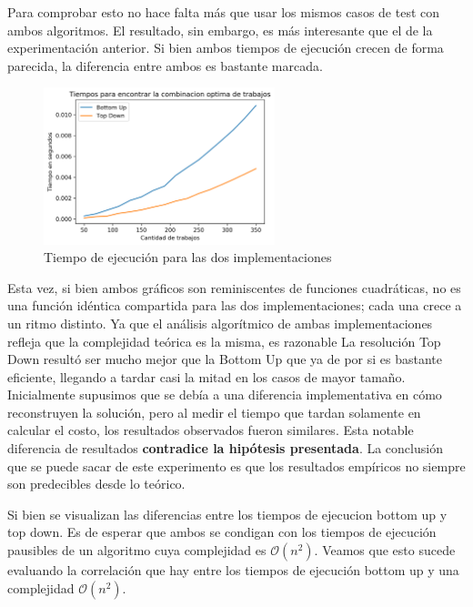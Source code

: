 \documentclass[a4paper]{report}
\begin{document}
Para comprobar esto no hace falta más que usar los mismos casos de test con ambos algoritmos. El resultado, sin embargo, es más interesante que el de la experimentación anterior. Si bien ambos tiempos de ejecución crecen de forma parecida, la diferencia entre ambos es bastante marcada. 

\begin{figure}
    \includegraphics[width=0.6\textwidth]{bottomUp_topDown.png}
    \caption{Tiempo de ejecución para las dos implementaciones}
    \label{fig:bottomup_topdown}
\end{figure}

Esta vez, si bien ambos gráficos son reminiscentes de funciones cuadráticas, no es una función idéntica compartida para las dos implementaciones; cada una crece a un ritmo distinto. Ya que el análisis algorítmico de ambas implementaciones refleja que la complejidad teórica es la misma, es razonable  La resolución Top Down resultó ser mucho mejor que la Bottom Up que ya de por si es bastante eficiente, llegando a tardar casi la mitad en los casos de mayor tamaño. Inicialmente supusimos que se debía a una diferencia implementativa en cómo reconstruyen la solución, pero al medir el tiempo que tardan solamente en calcular el costo, los resultados observados fueron similares. Esta notable diferencia de resultados \textbf{contradice la hipótesis presentada}. La conclusión que se puede sacar de este experimento es que los resultados empíricos no siempre son predecibles desde lo teórico.

Si bien se visualizan las diferencias entre los tiempos de ejecucion bottom up y top down. Es de esperar que ambos se condigan con los tiempos de ejecución pausibles de un algoritmo cuya complejidad es $\mathcal{O}(n^2)$.
Veamos que esto sucede evaluando la correlación que hay entre los tiempos de ejecución bottom up y una complejidad $\mathcal{O}(n^2)$.
\end{document}
